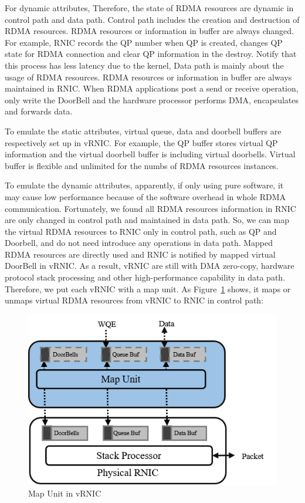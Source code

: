 For dynamic attributes, Therefore, the state of RDMA resources are dynamic in control path and data path. Control path includes the creation and destruction of RDMA resources. RDMA resources or information in buffer are always changed. For example, RNIC records the QP number when QP is created, changes QP state for RDMA connection and clear QP information in the destroy. Notify that this process has less latency due to the kernel, Data path is mainly about the usage of RDMA resources. RDMA resources or information in buffer are always maintained in RNIC. When RDMA applications post a send or receive operation, only write the DoorBell and the hardware processor performs DMA, encapsulates and forwards data.

To emulate the static attributes, virtual queue, data and doorbell buffers are respectively set up in vRNIC. For example, the QP buffer stores virtual QP information and the virtual doorbell buffer is including virtual doorbells. Virtual buffer is flexible and unlimited for the numbs of RDMA resources instances. 

To emulate the dynamic attributes, apparently, if only using pure software, it may cause low performance because of the software overhead in whole RDMA communication. Fortunately, we found all RDMA resources information in RNIC are only changed in control path and maintained in data path. So, we can map the virtual RDMA resources to RNIC only in control path, such as QP and Doorbell,  and do not need introduce any operations in data path. Mapped RDMA resources are directly used and RNIC is notified by mapped virtual DoorBell in vRNIC. As a result, vRNIC are still with DMA zero-copy, hardware protocol stack processing and other high-performance capability in data path. Therefore, we put each vRNIC with a map unit. As Figure~\ref{fig:map-unit} shows, it maps or unmaps virtual RDMA resources from vRNIC to RNIC in control path:

\begin{figure}[!ht]
	\centering
	\includegraphics[width=0.9\linewidth]{images/map-unit}
	\caption{Map Unit in vRNIC}
	\label{fig:map-unit}
\end{figure}

